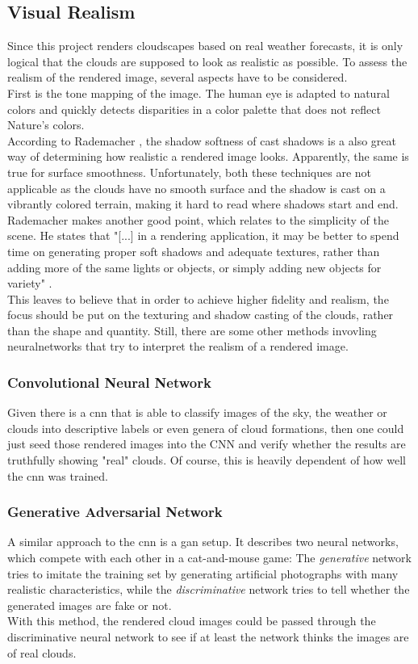 \subsection{Visual Realism}
\label{section:techimpl:measure}
Since this project renders cloudscapes based on real weather forecasts, it is only logical that the clouds are supposed to look as realistic as possible.
To assess the realism of the rendered image, several aspects have to be considered.
\\
First is the tone mapping of the image. The human eye is adapted to natural colors and quickly detects disparities in a color palette that does not reflect Nature's colors.
\\
According to Rademacher \cite{diglib:realism}, the shadow softness of cast shadows is a also great way of determining how realistic a rendered image looks.
Apparently, the same is true for surface smoothness.
Unfortunately, both these techniques are not applicable as the clouds have no smooth surface and the shadow is cast on a vibrantly colored terrain, making it hard to read where shadows start and end.
\\
Rademacher makes another good point, which relates to the simplicity of the scene.
He states that "[...] in a rendering application, it may be better to spend time on generating proper soft shadows and adequate textures, rather than adding more of the same lights
or objects, or simply adding new objects for variety" \cite{diglib:realism2}.
\\
This leaves to believe that in order to achieve higher fidelity and realism, the focus should be put on the texturing and shadow casting of the clouds, rather than the shape and quantity.
\emptyline
Still, there are some other methods invovling \gls{neuralnetwork}s that try to interpret the realism of a rendered image.

\subsubsection{Convolutional Neural Network}
Given there is a \gls{cnn} that is able to classify images of the sky, the weather or clouds into descriptive labels or even genera of cloud formations, then one could just seed those rendered images into the CNN and verify whether the results are truthfully showing "real" clouds.
Of course, this is heavily dependent of how well the \gls{cnn} was trained.

\subsubsection{Generative Adversarial Network}
A similar approach to the \gls{cnn} is a \gls{gan} setup. It describes two neural networks, which compete with each other in a cat-and-mouse game: The \textit{generative} network tries to imitate the training set by generating artificial photographs with many realistic characteristics, while the \emph{discriminative} network tries to tell whether the generated images are fake or not.
\\
With this method, the rendered cloud images could be passed through the discriminative neural network to see if at least the network thinks the images are of real clouds.

